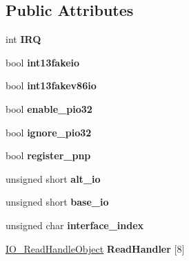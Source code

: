 \subsection*{Public Attributes}
\begin{DoxyCompactItemize}
\item 
\hypertarget{classIDEController_a7e828c4f3b6fcfd4d20aded039e94a49}{int {\bfseries I\-R\-Q}}\label{classIDEController_a7e828c4f3b6fcfd4d20aded039e94a49}

\item 
\hypertarget{classIDEController_a3b5affb9f98f08f2426d56e72732a65c}{bool {\bfseries int13fakeio}}\label{classIDEController_a3b5affb9f98f08f2426d56e72732a65c}

\item 
\hypertarget{classIDEController_a36d71f3249f63828a83a0af0f0f92956}{bool {\bfseries int13fakev86io}}\label{classIDEController_a36d71f3249f63828a83a0af0f0f92956}

\item 
\hypertarget{classIDEController_aa39a6a41daf4dbbf3d266cddd4e7c7e2}{bool {\bfseries enable\-\_\-pio32}}\label{classIDEController_aa39a6a41daf4dbbf3d266cddd4e7c7e2}

\item 
\hypertarget{classIDEController_a331c284417e9c19f1f93ceec979b780d}{bool {\bfseries ignore\-\_\-pio32}}\label{classIDEController_a331c284417e9c19f1f93ceec979b780d}

\item 
\hypertarget{classIDEController_a4d7493988b0bbb0162fdae1dd51d2a53}{bool {\bfseries register\-\_\-pnp}}\label{classIDEController_a4d7493988b0bbb0162fdae1dd51d2a53}

\item 
\hypertarget{classIDEController_a50d5d185c8c14e49f65592f892ad6a4f}{unsigned short {\bfseries alt\-\_\-io}}\label{classIDEController_a50d5d185c8c14e49f65592f892ad6a4f}

\item 
\hypertarget{classIDEController_acc4815a819613ea23dbcdc82af89dfaf}{unsigned short {\bfseries base\-\_\-io}}\label{classIDEController_acc4815a819613ea23dbcdc82af89dfaf}

\item 
\hypertarget{classIDEController_accc26cb09f9b368964460465ed3d84b8}{unsigned char {\bfseries interface\-\_\-index}}\label{classIDEController_accc26cb09f9b368964460465ed3d84b8}

\item 
\hypertarget{classIDEController_ad42828f82252166a49c5c3400910320c}{\hyperlink{classIO__ReadHandleObject}{I\-O\-\_\-\-Read\-Handle\-Object} {\bfseries Read\-Handler} \mbox{[}8\mbox{]}}\label{classIDEController_ad42828f82252166a49c5c3400910320c}


\end{DoxyCompactItemize}
